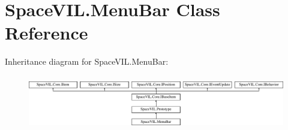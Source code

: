 \hypertarget{class_space_v_i_l_1_1_menu_bar}{}\section{Space\+V\+I\+L.\+Menu\+Bar Class Reference}
\label{class_space_v_i_l_1_1_menu_bar}
Inheritance diagram for Space\+V\+I\+L.\+Menu\+Bar\+:\begin{figure}[H]
\begin{center}
\leavevmode
\includegraphics[height=2.421622cm]{class_space_v_i_l_1_1_menu_bar}
\end{center}
\end{figure}
